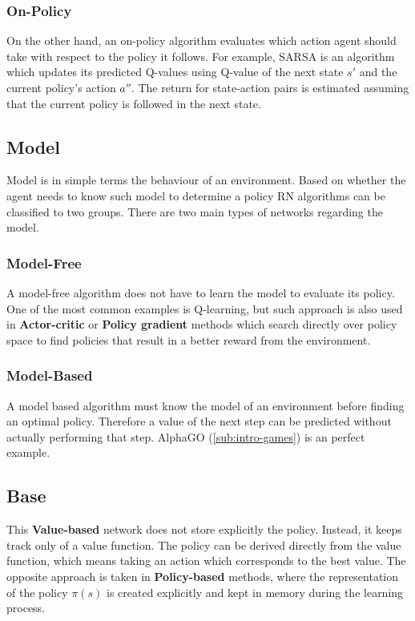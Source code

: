 \subsubsection*{On-Policy}
\label{sub2:on-policy}

On the other hand, an on-policy algorithm evaluates which action agent should take with respect to the policy it follows. For example, SARSA is an algorithm which updates its predicted Q-values using Q-value of the next state $s'$ and the current policy's action $a''$. The return for state-action pairs is estimated assuming that the current policy is followed in the next state.

\subsection{Model}
\label{sub:model}

Model is in simple terms the behaviour of an environment. Based on whether the agent needs to know such model to determine a policy RN algorithms can be classified to two groups. There are two main types of networks regarding the model.

\subsubsection*{Model-Free}
\label{sub2:model-free}

A model-free algorithm does not have to learn the model to evaluate its policy. One of the most common examples is Q-learning, but such approach is also used in \textbf{Actor-critic} or \textbf{Policy gradient} methods which search directly over policy space to find policies that result in a better reward from the environment.

\subsubsection*{Model-Based}
\label{sub2:model-based}

A model based algorithm must know the model of an environment before finding an optimal policy. Therefore a value of the next step can be predicted without actually performing that step. \mbox{AlphaGO} (\ref{sub:intro-games}) is an perfect example.

\subsection{Base}
\label{sub:base}

This \textbf{Value-based} network does not store explicitly the policy. Instead, it keeps track only of a value function. The policy can be derived directly from the value function, which means taking an action which corresponds to the best value.
The opposite approach is taken in \textbf{Policy-based} methods, where the representation of the policy $\pi(s)$ is created explicitly and kept in memory during the learning process. 

